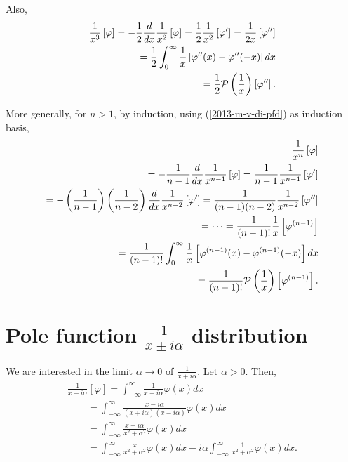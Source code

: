Also,
\begin{equation}
\begin{split}
\frac{1}{x^3} \left[ \varphi \right]
=
-\frac{1}{2}\frac{d}{dx} \frac{1}{x^2} \left[ \varphi \right]
=\frac{1}{2}\frac{1}{x^2} \left[ \varphi ' \right] =  \frac{1}{2x} \left[ \varphi '' \right]\\
=
\frac{1}{2} \int_0^{\infty}  \frac{1}{x}  \left[  \varphi''(x)
-
   \varphi''(-x) \right] dx
\\
 =
\frac{1}{2} {\cal P} \left(\frac{1}{x}\right) \left[\varphi '' \right]
 .
\label{2013-m-v-di-pfd3}
\end{split}
\end{equation}


More generally, for $n>1$, by induction, using (\ref{2013-m-v-di-pfd}) as induction basis,
\begin{equation}
\begin{split}
\frac{1}{x^n} \left[ \varphi \right]  \\
=
-\frac{1}{n-1}\frac{d}{dx} \frac{1}{x^{n-1}} \left[ \varphi \right]
=
 \frac{1}{n-1}  \frac{1}{x^{n-1}} \left[ \varphi' \right]  \\
=
-\left( \frac{1}{n-1} \right) \left(\frac{1}{n-2}\right) \frac{d}{dx} \frac{1}{x^{n-2}} \left[ \varphi' \right]
=
 \frac{1}{(n-1)(n-2)}   \frac{1}{x^{n-2}} \left[ \varphi'' \right]  \\
=   \cdots =
\frac{1}{(n-1)!} \frac{1}{x} \left[ \varphi^{({n-1})} \right]  \\
=\frac{1}{(n-1)!}
\int_0^{\infty}  \frac{1}{x}  \left[  \varphi^{(n-1)}(x)
-
   \varphi^{(n-1)}(-x) \right] dx
\\
 =
\frac{1}{(n-1)!} {\cal P} \left(\frac{1}{x}\right) \left[\varphi^{(n-1)} \right]
 .
\end{split}
\end{equation}




\section{Pole function $\frac{1}{x\pm i\alpha}$ distribution}

We are interested in the limit $\alpha  \rightarrow 0$ of $\frac{1}{x+i\alpha}$.
Let  $\alpha >0$. Then,
\begin{equation}
\begin{split}
\frac{1}{x+i\alpha} \left[ \varphi \right]
=
\int_{-\infty}^\infty  \frac{1}{x+i\alpha}  \varphi(x) dx
\\
\qquad
=
\int_{-\infty}^\infty   \frac{x-i\alpha}{ (x+i\alpha)(x-i\alpha) }   \varphi(x) dx
\\
\qquad
=
\int_{-\infty}^\infty   \frac{x-i\alpha}{x^2+ \alpha^2}   \varphi(x) dx
\\
\qquad
=
\int_{-\infty}^\infty   \frac{x}{x^2+ \alpha^2}   \varphi(x) dx
-i\alpha \int_{-\infty}^\infty   \frac{1}{x^2+ \alpha^2}   \varphi(x) dx
.
\end{split}
\label{2012-m-ch-di-mf}
\end{equation}

